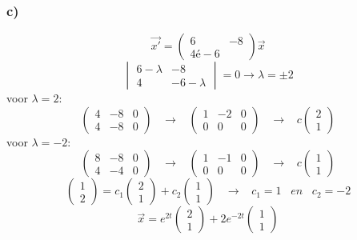 \documentclass[11pt]{article}
\begin{document}
\subsubsection*{c)}
\[
\vec{x'}
= 
\begin{pmatrix}
6 & -8\\
4 é -6
\end{pmatrix}
\vec{x}
\]
\[
\begin{vmatrix}
6-\lambda & -8\\
4 & -6-\lambda
\end{vmatrix}
=0
\longrightarrow
\lambda= \pm 2
\]
voor $\lambda=2$:
\[
\left(
\begin{array}{cc|c}
4 & -8 & 0 \\
4 & -8 & 0
\end{array}
\right)
\;\;\;\longrightarrow\;\;\;
\left(
\begin{array}{cc|c}
1 & -2 & 0 \\
0 & 0 & 0
\end{array}
\right)
\;\;\;\longrightarrow\;\;\;
c
\begin{pmatrix}
2\\1
\end{pmatrix}
\]
voor $\lambda=-2$:
\[
\left(
\begin{array}{cc|c}
8 & -8 & 0 \\
4 & -4 & 0
\end{array}
\right)
\;\;\;\longrightarrow\;\;\;
\left(
\begin{array}{cc|c}
1 & -1 & 0 \\
0 & 0 & 0
\end{array}
\right)
\;\;\;\longrightarrow\;\;\;
c
\begin{pmatrix}
1\\1
\end{pmatrix}
\]
\[
\begin{pmatrix}
1\\2
\end{pmatrix}
=
c_1
\begin{pmatrix}
2\\1
\end{pmatrix}
+
c_2
\begin{pmatrix}
1\\1
\end{pmatrix}
\;\;\;\longrightarrow\;\;\;
c_1 = 1
\;\;\;en\;\;\;
c_2 = -2
\]
\[
\vec{x}=
e^{2t}
\begin{pmatrix}
2\\1
\end{pmatrix}
+
2e^{-2t}
\begin{pmatrix}
1\\1
\end{pmatrix}
\]
\end{document}
